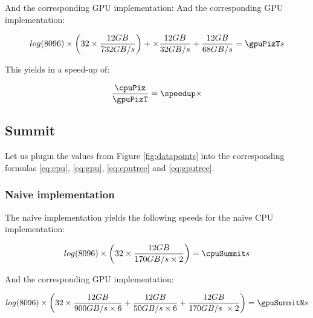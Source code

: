 \documentclass[]{article}
\begin{document}
And the corresponding GPU implementation:
\pgfmathsetmacro{}
And the corresponding GPU implementation:
\begin{center}
	\begin{equation}
		log(\d) \times \left ( \p \times \frac{\s GB}{732 GB/s} \right ) + \times \frac{\s GB}{32 GB/s}  + \frac{\s GB}{68 GB/s} = \gpuPizT s
	\end{equation}
\end{center}

This yields in a speed-up of:
\pgfmathsetmacro\speedup{\cpuPiz / \gpuPizT}
\begin{center}
	\begin{equation}
		\frac{\cpuPiz}{\gpuPizT} = \speedup \times
	\end{equation}
\end{center}

\vspace{5mm}


\subsection{Summit}

Let us plugin the values from Figure \ref{fig:datapoints} into the corresponding formulas \ref{eq:cpu}, \ref{eq:gpu}, \ref{eq:cputree} and \ref{eq:gputree}.

\subsubsection{Naive implementation}
The naive implementation yields the following speeds for the naive CPU  implementation:

\pgfmathsetmacro{}
\begin{center}
	\begin{equation}
		log(\d) \times \left ( \p \times \frac{ \s GB }{170 GB/s \times 2} \right ) = \cpuSummit s
	\end{equation}
\end{center}

And the corresponding GPU implementation:
\pgfmathsetmacro{}
\begin{center}
	\begin{equation}
		log(\d) \times \left ( \p \times \frac{\s GB}{900 GB/s \times 6} + \frac{\s GB}{50 GB/s \times 6}  + \frac{\s GB}{170 GB/s \ \times 2} \right )= \gpuSummitN s
	\end{equation}
\end{center}
\end{document}
